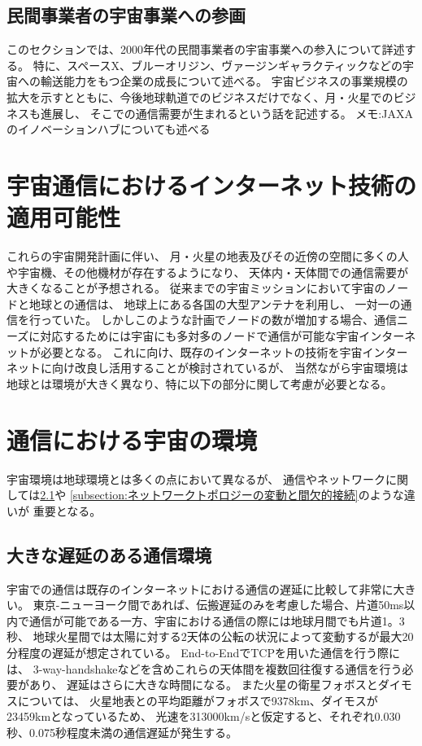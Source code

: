 \subsection{民間事業者の宇宙事業への参画}
\label{subsection:民間事業者の宇宙事業への参画}
このセクションでは、2000年代の民間事業者の宇宙事業への参入について詳述する。
特に、スペースX、ブルーオリジン、ヴァージンギャラクティックなどの宇宙への輸送能力をもつ企業の成長について述べる。
宇宙ビジネスの事業規模の拡大を示すとともに、今後地球軌道でのビジネスだけでなく、月・火星でのビジネスも進展し、
そこでの通信需要が生まれるという話を記述する。
メモ:JAXAのイノベーションハブについても述べる

\section{宇宙通信におけるインターネット技術の適用可能性}
\label{section:宇宙通信におけるインターネット技術の適用性}
これらの宇宙開発計画に伴い、 月・火星の地表及びその近傍の空間に多くの人や宇宙機、その他機材が存在するようになり、
天体内・天体間での通信需要が大きくなることが予想される。 
従来までの宇宙ミッションにおいて宇宙のノードと地球との通信は、 地球上にある各国の大型アンテナを利用し、 一対一の通信を行っていた。
しかしこのような計画でノードの数が増加する場合、通信ニーズに対応するためには宇宙にも多対多のノードで通信が可能な宇宙インターネットが必要となる。 
これに向け、既存のインターネットの技術を宇宙インターネットに向け改良し活用することが検討されているが、
当然ながら宇宙環境は地球とは環境が大きく異なり、特に以下の部分に関して考慮が必要となる。

\section{通信における宇宙の環境}
\label{section:通信における宇宙の環境}
宇宙環境は地球環境とは多くの点において異なるが、
通信やネットワークに関しては\ref{subsection:大きな遅延のある通信環境}や
\ref{subsection:ネットワークトポロジーの変動と間欠的接続}のような違いが
重要となる。


\subsection{大きな遅延のある通信環境}
\label{subsection:大きな遅延のある通信環境}
宇宙での通信は既存のインターネットにおける通信の遅延に比較して非常に大きい。
東京-ニューヨーク間であれば、伝搬遅延のみを考慮した場合、片道50ms以内で通信が可能である一方、宇宙における通信の際には地球月間でも片道1。3秒、
地球火星間では太陽に対する2天体の公転の状況によって変動するが最大20分程度の遅延が想定されている。
End-to-EndでTCPを用いた通信を行う際には、 3-way-handshakeなどを含めこれらの天体間を複数回往復する通信を行う必要があり、 
遅延はさらに大きな時間になる。 
\cite{McBrayer2022}
また火星の衛星フォボスとダイモスについては、
火星地表との平均距離がフォボスで9378km、ダイモスが23459kmとなっているため、
光速を313000km/sと仮定すると、それぞれ0.030秒、0.075秒程度未満の通信遅延が発生する。



